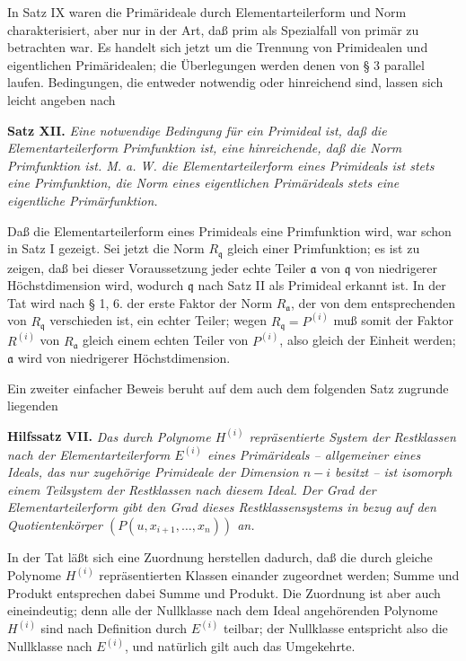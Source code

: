 \documentclass[11pt]{article}
\providecommand{\frakq}{\mathfrak q}
\providecommand{\fraka}{\mathfrak a}
\begin{document}
In Satz IX waren die Primärideale durch Elementarteilerform und Norm charakterisiert, aber nur in der Art, daß prim als Spezialfall von primär zu betrachten war. Es handelt sich jetzt um die Trennung von Primidealen und eigentlichen Primäridealen; die Überlegungen werden denen von § 3 parallel laufen. Bedingungen, die entweder notwendig oder hinreichend sind, lassen sich leicht angeben nach

\textbf{Satz XII.} \emph{Eine notwendige Bedingung für ein Primideal ist, daß die Elementarteilerform Primfunktion ist, eine hinreichende, daß die Norm Primfunktion ist. M. a. W. die Elementarteilerform eines Primideals ist stets eine Primfunktion, die Norm eines eigentlichen Primärideals stets eine eigentliche Primärfunktion.}

Daß die Elementarteilerform eines Primideals eine Primfunktion wird, war schon in Satz I gezeigt. Sei jetzt die Norm $R_\frakq$ gleich einer Primfunktion; es ist zu zeigen, daß bei dieser Voraussetzung jeder echte Teiler $\fraka$ von $\frakq$ von niedrigerer Höchstdimension wird, wodurch $\frakq$ nach Satz II als Primideal erkannt ist. In der Tat wird nach § 1, 6. der erste Faktor der Norm $R_\fraka$, der von dem entsprechenden von $R_\frakq$ verschieden ist, ein echter Teiler; wegen $R_\frakq=P^{(i)}$ muß somit der Faktor $R^{(i)}$ von $R_\fraka$ gleich einem echten Teiler von $P^{(i)}$, also gleich der Einheit werden; $\fraka$ wird von niedrigerer Höchstdimension.

Ein zweiter einfacher Beweis beruht auf dem auch dem folgenden Satz zugrunde liegenden

\textbf{Hilfssatz VII.} \emph{Das durch Polynome $H^{(i)}$ repräsentierte System der Restklassen nach der Elementarteilerform $E^{(i)}$ eines Primärideals -- allgemeiner eines Ideals, das nur zugehörige Primideale der Dimension $n-i$ besitzt -- ist isomorph einem Teilsystem der Restklassen nach diesem Ideal. Der Grad der Elementarteilerform gibt den Grad dieses Restklassensystems in bezug auf den Quotientenkörper $(P(u,x_{i+1},\ldots,x_n))$ an.}

In der Tat läßt sich eine Zuordnung herstellen dadurch, daß die durch gleiche Polynome $H^{(i)}$ repräsentierten Klassen einander zugeordnet werden; Summe und Produkt entsprechen dabei Summe und Produkt. Die Zuordnung ist aber auch eineindeutig; denn alle der Nullklasse nach dem Ideal angehörenden Polynome $H^{(i)}$ sind nach Definition durch $E^{(i)}$ teilbar; der Nullklasse entspricht also die Nullklasse nach $E^{(i)}$, und natürlich gilt auch das Umgekehrte.
\end{document}
